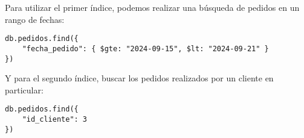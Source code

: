 Para utilizar el primer índice, podemos realizar una búsqueda de pedidos en un rango de fechas:

\begin{verbatim}
db.pedidos.find({
    "fecha_pedido": { $gte: "2024-09-15", $lt: "2024-09-21" }
})
\end{verbatim}

Y para el segundo índice, buscar los pedidos realizados por un cliente en particular:

\begin{verbatim}
db.pedidos.find({
    "id_cliente": 3
})
\end{verbatim}